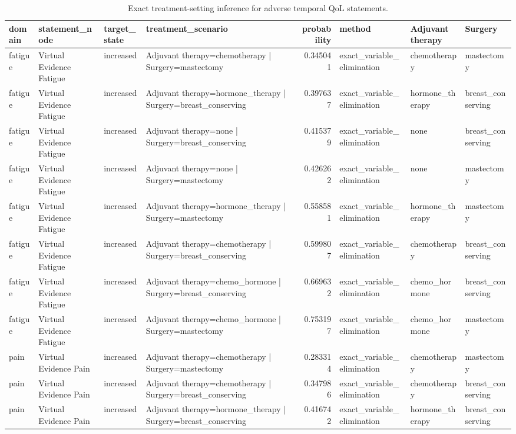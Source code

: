 \begin{table}
\caption{Exact treatment-setting inference for adverse temporal QoL statements.}
\label{tab:inference_adverse}
\begin{tabular}{llllrlll}
\toprule
domain & statement\_node & target\_state & treatment\_scenario & probability & method & Adjuvant therapy & Surgery \\
\midrule
fatigue & Virtual Evidence Fatigue & increased & Adjuvant therapy=chemotherapy | Surgery=mastectomy & 0.345041 & exact\_variable\_elimination & chemotherapy & mastectomy \\
fatigue & Virtual Evidence Fatigue & increased & Adjuvant therapy=hormone\_therapy | Surgery=breast\_conserving & 0.397637 & exact\_variable\_elimination & hormone\_therapy & breast\_conserving \\
fatigue & Virtual Evidence Fatigue & increased & Adjuvant therapy=none | Surgery=breast\_conserving & 0.415379 & exact\_variable\_elimination & none & breast\_conserving \\
fatigue & Virtual Evidence Fatigue & increased & Adjuvant therapy=none | Surgery=mastectomy & 0.426262 & exact\_variable\_elimination & none & mastectomy \\
fatigue & Virtual Evidence Fatigue & increased & Adjuvant therapy=hormone\_therapy | Surgery=mastectomy & 0.558581 & exact\_variable\_elimination & hormone\_therapy & mastectomy \\
fatigue & Virtual Evidence Fatigue & increased & Adjuvant therapy=chemotherapy | Surgery=breast\_conserving & 0.599807 & exact\_variable\_elimination & chemotherapy & breast\_conserving \\
fatigue & Virtual Evidence Fatigue & increased & Adjuvant therapy=chemo\_hormone | Surgery=breast\_conserving & 0.669632 & exact\_variable\_elimination & chemo\_hormone & breast\_conserving \\
fatigue & Virtual Evidence Fatigue & increased & Adjuvant therapy=chemo\_hormone | Surgery=mastectomy & 0.753197 & exact\_variable\_elimination & chemo\_hormone & mastectomy \\
pain & Virtual Evidence Pain & increased & Adjuvant therapy=chemotherapy | Surgery=mastectomy & 0.283314 & exact\_variable\_elimination & chemotherapy & mastectomy \\
pain & Virtual Evidence Pain & increased & Adjuvant therapy=chemotherapy | Surgery=breast\_conserving & 0.347986 & exact\_variable\_elimination & chemotherapy & breast\_conserving \\
pain & Virtual Evidence Pain & increased & Adjuvant therapy=hormone\_therapy | Surgery=breast\_conserving & 0.416742 & exact\_variable\_elimination & hormone\_therapy & breast\_conserving \\

\end{tabular}
\end{table}
